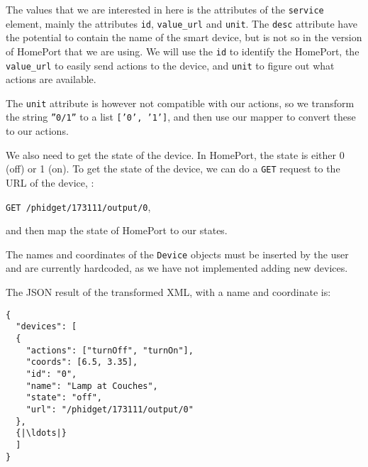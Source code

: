 The values that we are interested in here is the attributes of the \texttt{service} element, 
mainly the attributes \texttt{id}, \texttt{value\_url} and \texttt{unit}. 
The \texttt{desc} attribute have the potential to contain the name of the smart device, 
but is not so in the version of HomePort that we are using. 
We will use the \texttt{id} to identify the HomePort, 
the \texttt{value\_url} to easily send actions to the device, 
and \texttt{unit} to figure out what actions are available. 

The \texttt{unit} attribute is however not compatible with our actions, 
so we transform the string \texttt{''0/1''} to a list \texttt{['0', '1']}, 
and then use our mapper to convert these to our actions. 

We also need to get the state of the device. 
In HomePort, the state is either 0 (off) or 1 (on). 
To get the state of the device, 
we can do a \texttt{GET} request to the URL of the device, \eg:
\begin{center}
  \texttt{GET /phidget/173111/output/0},
\end{center}
and then map the state of HomePort to our states.

The names and coordinates of the \texttt{Device} objects must be inserted by the user and are currently hardcoded, 
as we have not implemented adding new devices. 

The JSON result of the transformed XML, with a name and coordinate is:

\begin{verbatim}
{
  "devices": [
  {
    "actions": ["turnOff", "turnOn"], 
    "coords": [6.5, 3.35], 
    "id": "0", 
    "name": "Lamp at Couches", 
    "state": "off", 
    "url": "/phidget/173111/output/0"
  }, 
  {|\ldots|}
  ]
}
\end{verbatim}

